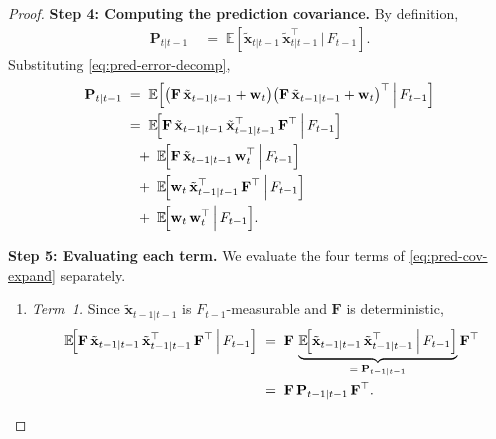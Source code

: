\documentclass[12pt,openany]{book}
\numberwithin{equation}{chapter}
\theoremstyle{plain}
\theoremstyle{definition}
\theoremstyle{remark}
\def\mathcal#1{#1}%
\begin{document}
\begin{proof}
\medskip
\noindent\textbf{Step 4: Computing the prediction covariance.}
By definition,
\begin{align}
  \mathbf{P}_{t|t-1}
  &\;=\;
  \mathbb{E}\!\left[
    \tilde{\mathbf{x}}_{t|t-1}\,
    \tilde{\mathbf{x}}_{t|t-1}^\top
    \,\Big|\, \mathcal{F}_{t-1}
  \right].
  \label{eq:pred-cov-def}
\end{align}
Substituting \eqref{eq:pred-error-decomp},
\begin{align}
  \mathbf{P}_{t|t-1}
  &\;=\;
  \mathbb{E}\!\left[
    \bigl(\mathbf{F}\,\tilde{\mathbf{x}}_{t-1|t-1}
          + \mathbf{w}_t\bigr)
    \bigl(\mathbf{F}\,\tilde{\mathbf{x}}_{t-1|t-1}
          + \mathbf{w}_t\bigr)^\top
    \,\Big|\, \mathcal{F}_{t-1}
  \right]
  \label{eq:pred-cov-sub} \\
  &\;=\;
  \mathbb{E}\!\Bigl[
    \mathbf{F}\,\tilde{\mathbf{x}}_{t-1|t-1}\,
    \tilde{\mathbf{x}}_{t-1|t-1}^\top\,\mathbf{F}^\top
    \,\Big|\, \mathcal{F}_{t-1}
  \Bigr]
  \notag \\
  &\quad
  +\;
  \mathbb{E}\!\Bigl[
    \mathbf{F}\,\tilde{\mathbf{x}}_{t-1|t-1}\,
    \mathbf{w}_t^\top
    \,\Big|\, \mathcal{F}_{t-1}
  \Bigr]
  \notag \\
  &\quad
  +\;
  \mathbb{E}\!\Bigl[
    \mathbf{w}_t\,
    \tilde{\mathbf{x}}_{t-1|t-1}^\top\,\mathbf{F}^\top
    \,\Big|\, \mathcal{F}_{t-1}
  \Bigr]
  \notag \\
  &\quad
  +\;
  \mathbb{E}\!\Bigl[
    \mathbf{w}_t\,\mathbf{w}_t^\top
    \,\Big|\, \mathcal{F}_{t-1}
  \Bigr].
  \label{eq:pred-cov-expand}
\end{align}

\medskip
\noindent\textbf{Step 5: Evaluating each term.}
We evaluate the four terms of \eqref{eq:pred-cov-expand}
separately.
\begin{enumerate}
  \item \emph{Term~1.}
        Since $\tilde{\mathbf{x}}_{t-1|t-1}$ is
        $\mathcal{F}_{t-1}$-measurable and $\mathbf{F}$ is
        deterministic,
        \begin{align}
          \mathbb{E}\!\Bigl[
            \mathbf{F}\,\tilde{\mathbf{x}}_{t-1|t-1}\,
            \tilde{\mathbf{x}}_{t-1|t-1}^\top\,\mathbf{F}^\top
            \,\Big|\, \mathcal{F}_{t-1}
          \Bigr]
          &\;=\;
          \mathbf{F}\,
          \underbrace{
            \mathbb{E}\!\Bigl[
              \tilde{\mathbf{x}}_{t-1|t-1}\,
              \tilde{\mathbf{x}}_{t-1|t-1}^\top
              \,\Big|\, \mathcal{F}_{t-1}
            \Bigr]
          }_{=\;\mathbf{P}_{t-1|t-1}}
          \mathbf{F}^\top
          \notag \\
          &\;=\;
          \mathbf{F}\,\mathbf{P}_{t-1|t-1}\,\mathbf{F}^\top.
          \label{eq:term1-eval}
        \end{align}


\end{enumerate}
\end{proof}
\end{document}
